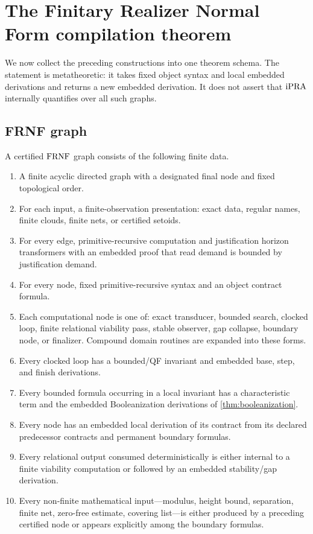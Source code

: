 \section{The Finitary Realizer Normal Form compilation theorem}
\label{sec:compilation-theorem}

We now collect the preceding constructions into one theorem schema.  The statement is
metatheoretic: it takes fixed object syntax and local embedded derivations and returns a
new embedded derivation.  It does not assert that \(\mathrm{iPRA}\) internally quantifies over
all such graphs.

\subsection{FRNF graph}

\begin{definition}
A certified \(\mathrm{FRNF}\) graph consists of the following finite data.

\begin{enumerate}[label=\textnormal{G\arabic*.},leftmargin=3.4em]
\item A finite acyclic directed graph with a designated final node and fixed
 topological order.
\item For each input, a finite-observation presentation: exact data, regular names,
 finite clouds, finite nets, or certified setoids.
\item For every edge, primitive-recursive computation and justification horizon
 transformers with an embedded proof that read demand is bounded by justification
 demand.
\item For every node, fixed primitive-recursive syntax and an object contract formula.
\item Each computational node is one of: exact transducer, bounded search, clocked
 loop, finite relational viability pass, stable observer, gap collapse, boundary node,
 or finalizer.  Compound domain routines are expanded into these forms.
\item Every clocked loop has a bounded/QF invariant and embedded base, step, and finish
 derivations.
\item Every bounded formula occurring in a local invariant has a characteristic term
 and the embedded Booleanization derivations of \cref{thm:booleanization}.
\item Every node has an embedded local derivation of its contract from its declared
 predecessor contracts and permanent boundary formulas.
\item Every relational output consumed deterministically is either internal to a
 finite viability computation or followed by an embedded stability/gap derivation.
\item Every non-finite mathematical input---modulus, height bound, separation, finite
 net, zero-free estimate, covering list---is either produced by a preceding certified
 node or appears explicitly among the boundary formulas.
\end{enumerate}
\end{definition}

